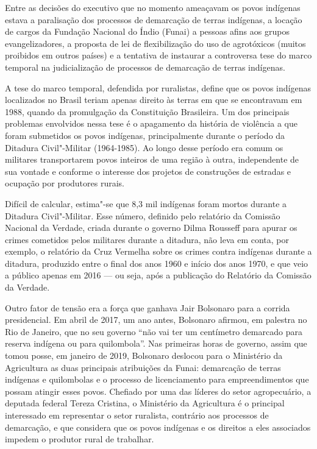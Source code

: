 Entre as decisões do executivo que no momento ameaçavam os povos indígenas estava a paralisação dos processos de
demarcação de terras indígenas, a locação de cargos da Fundação Nacional
do Índio (Funai) a pessoas afins aos grupos
evangelizadores, a proposta de lei de flexibilização do uso de
agrotóxicos (muitos proibidos em outros países) e a tentativa de
instaurar a controversa tese do marco temporal na judicialização de
processos de demarcação de terras indígenas.

A tese do marco temporal, defendida por ruralistas, define que os povos
indígenas localizados no Brasil teriam apenas direito às terras em que
se encontravam em 1988, quando da promulgação da Constituição
Brasileira. Um dos principais problemas envolvidos nessa tese é o
apagamento da história de violência a que foram submetidos os povos
indígenas, principalmente durante o período da Ditadura Civil"-Militar
(1964-1985). Ao longo desse período era comum os militares transportarem povos inteiros
de uma região à outra, independente de sua vontade e conforme o
interesse dos projetos de construções de estradas e ocupação por
produtores rurais.

Difícil de calcular, estima"-se que 8,3 mil indígenas foram mortos
durante a Ditadura Civil"-Militar. Esse número, definido pelo relatório da
Comissão Nacional da Verdade, criada durante o governo Dilma Rousseff
para apurar os crimes cometidos pelos militares durante a ditadura, não
leva em conta, por exemplo, o relatório da Cruz Vermelha sobre os crimes
contra indígenas durante a ditadura, produzido entre o final dos anos 1960
e início dos anos 1970, e que veio a público apenas em 2016 --- ou seja, após a publicação do Relatório da Comissão da Verdade.

Outro fator de tensão era a força que ganhava Jair Bolsonaro para a
corrida presidencial. Em abril de 2017, um ano antes, Bolsonaro afirmou,
em palestra no Rio de Janeiro, que no seu governo ``não vai ter um
centímetro demarcado para reserva indígena ou para quilombola''. Nas
primeiras horas de governo, assim que tomou posse, em janeiro de 2019,
Bolsonaro deslocou para o Ministério da Agricultura as duas principais
atribuições da Funai: demarcação de terras indígenas e quilombolas e o
processo de licenciamento para empreendimentos que possam atingir esses
povos. Chefiado por uma das líderes do setor agropecuário, a deputada
federal Tereza Cristina, o Ministério da Agricultura é o principal
interessado em representar o setor ruralista, contrário aos processos
de demarcação, e que considera que os povos indígenas e os direitos a
eles associados impedem o produtor rural de trabalhar.

